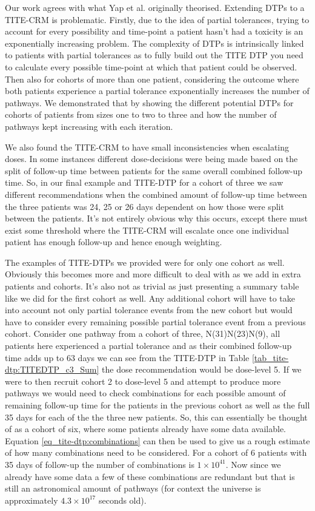 Our work agrees with what Yap et al. \cite{yapDoseTransitionPathways2017} originally theorised. Extending DTPs to a TITE-CRM is problematic. Firstly, due to the idea of partial tolerances, trying to account for every possibility and time-point a patient hasn't had a toxicity is an exponentially increasing problem. The complexity of DTPs is intrinsically linked to patients with partial tolerances as to fully build out the TITE DTP you need to calculate every possible time-point at which that patient could be observed. Then also for cohorts of more than one patient, considering the outcome where both patients experience a partial tolerance exponentially increases the number of pathways. We demonstrated that by showing the different potential DTPs for cohorts of patients from sizes one to two to three and how the number of pathways kept increasing with each iteration. 

We also found the TITE-CRM to have small inconsistencies when escalating doses. In some instances different dose-decisions were being made based on the split of follow-up time between patients for the same overall combined follow-up time. So, in our final example and TITE-DTP for a cohort of three we saw different recommendations when the combined amount of follow-up time between the three patients was 24, 25 or 26 days dependent on how those were split between the patients. It's not entirely obvious why this occurs, except there must exist some threshold where the TITE-CRM will escalate once one individual patient has enough follow-up and hence enough weighting. 

The examples of TITE-DTPs we provided were for only one cohort as well. Obviously this becomes more and more difficult to deal with as we add in extra patients and cohorts. It's also not as trivial as just presenting a summary table like we did for the first cohort as well. Any additional cohort will have to take into account not only partial tolerance events from the new cohort but would have to consider every remaining possible partial tolerance event from a previous cohort. Consider one pathway from a cohort of three, N(31)N(23)N(9), all patients here experienced a partial tolerance and as their combined follow-up time adds up to 63 days we can see from the TITE-DTP in Table \ref{tab_tite-dtp:TITEDTP_c3_Sum} the dose recommendation would be dose-level 5. If we were to then recruit cohort 2 to dose-level 5 and attempt to produce more pathways we would need to check combinations for each possible amount of remaining follow-up time for the patients in the previous cohort as well as the full 35 days for each of the the three new patients. So, this can essentially be thought of as a cohort of six, where some patients already have some data available. Equation \ref{eq_tite-dtp:combinations} can then be used to give us a rough estimate of how many combinations need to be considered. For a cohort of 6 patients with 35 days of follow-up the number of combinations is $1 \times 10^{41}$. Now since we already have some data a few of these combinations are redundant but that is still an astronomical amount of pathways (for context the universe is approximately $4.3 \times 10^{17}$ seconds old). 

